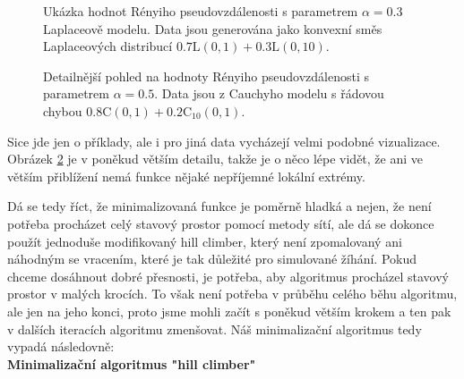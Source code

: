 \begin{figure}[htb!]
	\begin{center}
		\caption{Ukázka hodnot Rényiho pseudovzdálenosti s parametrem $\alpha = 0.3$ Laplaceově modelu. Data jsou generována jako konvexní směs Laplaceových distribucí $0.7\mathrm{L}(0,1) + 0.3 \mathrm{L}(0,10)$.}
		\label{fig-distanceL}
	\end{center}
\end{figure}

\begin{figure}[htb!]
	\begin{center}
		\caption{Detailnější pohled na hodnoty Rényiho pseudovzdálenosti s parametrem $\alpha = 0.5$. Data jsou z Cauchyho modelu s řádovou chybou $0.8\mathrm{C}(0,1) + 0.2 \mathrm{C}_{10}(0,1)$.}
		\label{fig-distanceC}
	\end{center}
\end{figure}

Sice jde jen o příklady, ale i pro jiná data vycházejí velmi podobné vizualizace. Obrázek \ref{fig-distanceC} je v poněkud větším detailu, takže je o něco lépe vidět, že ani ve větším přiblížení nemá funkce nějaké nepříjemné lokální extrémy. 

Dá se tedy říct, že minimalizovaná funkce je poměrně hladká a nejen, že není potřeba procházet celý stavový prostor pomocí metody sítí, ale dá se dokonce použít jednoduše modifikovaný hill climber, který není zpomalovaný ani náhodným se vracením, které je tak důležité pro simulované žíhání. Pokud chceme dosáhnout dobré přesnosti, je potřeba, aby algoritmus procházel stavový prostor v malých krocích. To však není potřeba v průběhu celého běhu algoritmu, ale jen na jeho konci, proto jsme mohli začít s poněkud větším krokem a ten pak v dalších iteracích algoritmu zmenšovat. Náš minimalizační algoritmus tedy vypadá následovně: 
\vspace{11 pt} \\
\textbf{Minimalizační algoritmus "hill climber"}

